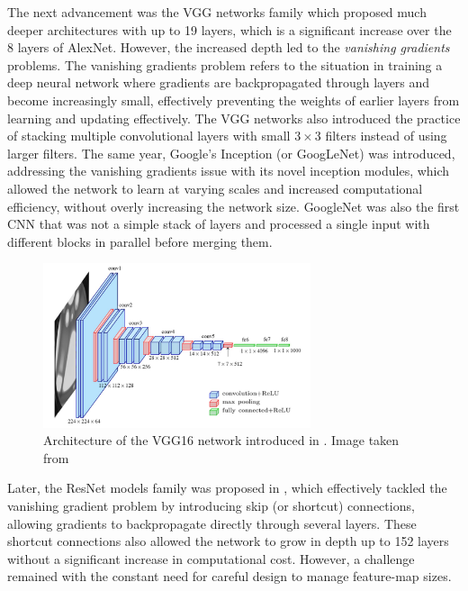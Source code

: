 The next advancement was the VGG networks family
\cite{DBLP:journals/corr/SimonyanZ14a} %
which proposed much deeper architectures with up to 19 layers, which is a
significant increase over the 8 layers of AlexNet. However, the increased depth
led to the \emph{vanishing gradients} problems. The vanishing gradients problem
refers to the situation in training a deep neural network where gradients are
backpropagated through layers and become increasingly small, effectively
preventing the weights of earlier layers from learning and updating effectively.
The VGG networks also introduced the practice of stacking multiple convolutional
layers with small $3\times 3$ filters instead of using larger filters. The same
year, Google's Inception (or GoogLeNet) \cite{DBLP:conf/cvpr/SzegedyLJSRAEVR15}
was introduced, addressing the vanishing gradients  issue with its novel
inception modules, which allowed the network to learn at varying scales and
increased computational efficiency, without overly increasing the network size.
GoogleNet was also the first \ac{CNN} that was not a simple stack of layers and
processed a single input with different blocks in parallel before merging
them.\\

\begin{figure}[htbp]
  \centering
  \includegraphics[width=0.7\textwidth]{chapter_sota/assets/vgg16.png}
  \caption{Architecture of the VGG16 network introduced in
    \cite{DBLP:journals/corr/SimonyanZ14a}. Image taken from
    \cite{ferguson2017automatic}}
  \label{fig:dlo:vgg16}
\end{figure}

Later, the ResNet models family was proposed in \cite{DBLP:conf/cvpr/HeZRS16},
which effectively tackled the vanishing gradient problem by introducing skip (or
shortcut) connections, allowing gradients to backpropagate directly through
several layers. These shortcut connections also allowed the network to grow in
depth up to 152 layers without a significant increase in computational cost.
However, a challenge remained with the constant need for careful design to
manage feature-map sizes.\\

